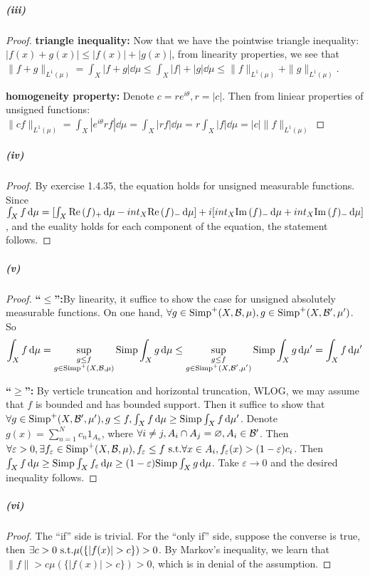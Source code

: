 \documentclass{article}
\begin{document}
\subparagraph{(iii)}
\begin{proof}
\textbf{triangle inequality:} Now that we have the pointwise triangle inequality: $|f(x)+g(x)|\leq |f(x)|+|g(x)|$, from linearity properties, we see that $\|f+g\|_{L^1(\mu)}=\int_X |f+g|\dd\mu\leq\int_X|f|+|g|\dd\mu\leq \|f\|_{L^1(\mu)}+\|g\|_{L^1(\mu)}$.

\textbf{homogeneity property:} Denote $c=re^{i\theta}, r=|c|$. Then from liniear properties of unsigned functions: $\|cf\|_{L^1(\mu)}=\int_X |e^{i\theta}rf|\dd\mu=\int_X |rf|\dd\mu=r\int_X |f|\dd\mu=|c|\|f\|_{L^1(\mu)}$
\end{proof}
\subparagraph{(iv)}
\begin{proof}
By exercise 1.4.35, the equation holds for unsigned measurable functions. Since $\int_X f \,\mathrm{d}\mu=[\int_X\mathrm{Re}\,(f)_+\,\mathrm{d}\mu-int_X\mathrm{Re}\,(f)_-\,\mathrm{d}\mu]+i[int_X\mathrm{Im}\,(f)_-\,\mathrm{d}\mu+int_X\mathrm{Im}\,(f)_-\,\mathrm{d}\mu]$, and the euality holds for each component of the equation, the statement follows.
\end{proof}
\subparagraph{(v)}
\begin{proof}
\textbf{``$\bm{\leq}$'':}By linearity, it suffice to show the case for unsigned absolutely measurable functions. On one hand, $\forall g\in \mathrm{Simp}^+(X,\mathcal{B},\mu),g\in \mathrm{Simp}^+(X,\mathcal{B}',\mu')$. So 
\[\int_{X}f\,\mathrm{d}\mu=\sup\limits_{\substack{g\leq f\\g\in\mathrm{Simp}^+(X,\mathcal{B},\mu)}}\mathrm{Simp}\int_{X}g\,\mathrm{d}\mu\leq\sup\limits_{\substack{g\leq f\\g\in\mathrm{Simp}^+(X,\mathcal{B}',\mu')}}\mathrm{Simp}\int_{X}g\,\mathrm{d}\mu'=\int_{X}f\,\mathrm{d}\mu'\]

\textbf{``$\bm{\geq}$'':} By verticle truncation and horizontal truncation, WLOG, we may assume that $f$ is bounded and has bounded support. Then it suffice to show that $\forall g\in \mathrm{Simp}^+(X,\mathcal{B}',\mu'), g\leq f, \int_{X}f\,\mathrm{d}\mu\geq \mathrm{Simp}\int_{X}f\,\mathrm{d}\mu'$. Denote $g(x)=\sum\limits_{n=1}^{N}c_n1_{A_n}$, where $\forall i\neq j, A_i\cap A_j=\varnothing, A_i\in\mathcal{B}'$. Then $\forall\varepsilon>0, \exists f_\varepsilon\in\mathrm{Simp}^+(X,\mathcal{B},\mu),f_\varepsilon\leq f\text{ s.t.}\forall x\in A_i, f_\varepsilon(x)>(1-\varepsilon)c_i$. Then $\int_{X}f\,\mathrm{d}\mu\geq \mathrm{Simp}\int_{X}f_\varepsilon\,\mathrm{d}\mu\geq (1-\varepsilon)\mathrm{Simp}\int_{X}g\,\mathrm{d}\mu$. Take $\varepsilon\to 0$ and the desired inequality follows.
\end{proof}
\subparagraph{(vi)}
\begin{proof}
The ``if'' side is trivial. For the ``only if'' side, suppose the converse is true, then $\exists c>0\st \mu(\{\left|f(x)\right|>c\})>0$. By Markov's inequality, we learn that $\|f\|>c\mu(\{|f(x)|>c\})>0$, which is in denial of the assumption.
\end{proof}
\end{document}
